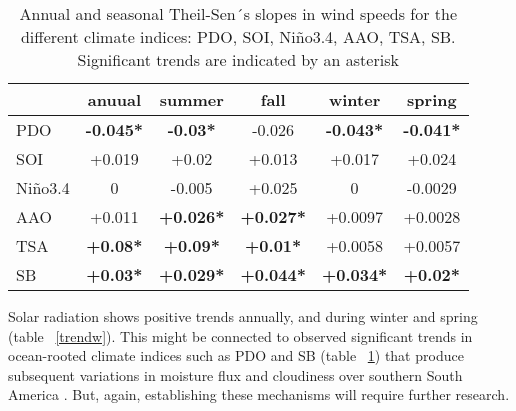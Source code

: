 \documentclass[AMA,Times1COL]{WileyNJDv5} %
\begin{document}
\begin{linenumbers}
\begin{table}[hbpt]
	\caption{Annual and seasonal Theil-Sen´s slopes in wind speeds for the different climate indices: PDO, SOI, Niño3.4, AAO, TSA, SB. Significant trends are indicated by an asterisk}
	\label{trend_i}
	\begin{tabular}{l|ccccc}
		
		& anuual & summer & fall & winter & spring \\
		\hline
		
		PDO &  \textbf{-0.045*}  &  \textbf{-0.03*}  & -0.026 &  \textbf{-0.043*}  &  \textbf{-0.041*} \\
		SOI &  +0.019  &  +0.02  &  +0.013  &  +0.017  &  +0.024  \\
		Niño3.4 &  0  &  -0.005  &  +0.025   &  0  &  -0.0029  \\
		AAO &  +0.011  &  \textbf{+0.026*}  &   \textbf{+0.027*}  &  +0.0097  &  +0.0028	  \\
		TSA &  \textbf{+0.08*}  &  \textbf{+0.09*}  &  \textbf{+0.01*}  &  +0.0058  &  +0.0057  \\
		SB &  \textbf{+0.03*}  & \textbf{+0.029*}  &  \textbf{+0.044*}  &  \textbf{+0.034*}  &  \textbf{+0.02*}  \\
		
	\end{tabular}
\end{table}


Solar radiation shows positive trends annually, and during winter and spring (table ~\ref{trendw}). This might be connected to observed significant trends in ocean-rooted climate indices such as PDO and SB (table ~\ref{trend_i}) that produce subsequent variations in moisture flux and cloudiness over southern South America \cite{seager2010tropical, montini2019south}. But, again, establishing these mechanisms will require  further research.


\end{linenumbers}
\end{document}
